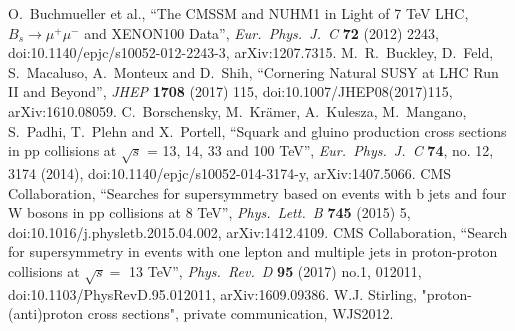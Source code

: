 \begin{thebibliography}{9}
O.~Buchmueller et al., ``The CMSSM and NUHM1 in Light of 7 TeV LHC, $B_s \to \mu^+\mu^-$ and XENON100 Data'', {\it Eur.\ Phys.\ J.\ C} {\bf 72} (2012) 2243, doi:10.1140/epjc/s10052-012-2243-3, arXiv:1207.7315.
M.~R.~Buckley, D.~Feld, S.~Macaluso, A.~Monteux and D.~Shih, ``Cornering Natural SUSY at LHC Run II and Beyond'', {\it JHEP} {\bf 1708} (2017) 115, doi:10.1007/JHEP08(2017)115, arXiv:1610.08059.
C.~Borschensky, M.~Krämer, A.~Kulesza, M.~Mangano, S.~Padhi, T.~Plehn and X.~Portell, ``Squark and gluino production cross sections in pp collisions at $\sqrt{s}$ = 13, 14, 33 and 100 TeV'', {\it Eur.\ Phys.\ J.\ C} {\bf 74}, no. 12, 3174 (2014), doi:10.1140/epjc/s10052-014-3174-y, arXiv:1407.5066.
CMS Collaboration, ``Searches for supersymmetry based on events with b jets and four W bosons in pp collisions at 8 TeV'', {\it Phys.\ Lett.\ B} {\bf 745} (2015) 5, doi:10.1016/j.physletb.2015.04.002, arXiv:1412.4109.
CMS Collaboration, ``Search for supersymmetry in events with one lepton and multiple jets in proton-proton collisions at $\sqrt s =$ 13 TeV'', {\it Phys.\ Rev.\ D} {\bf 95} (2017) no.1,  012011, doi:10.1103/PhysRevD.95.012011, arXiv:1609.09386.
W.J. Stirling, "proton-(anti)proton cross sections", private communication, WJS2012. 
 
    
%
 

\end{thebibliography}
